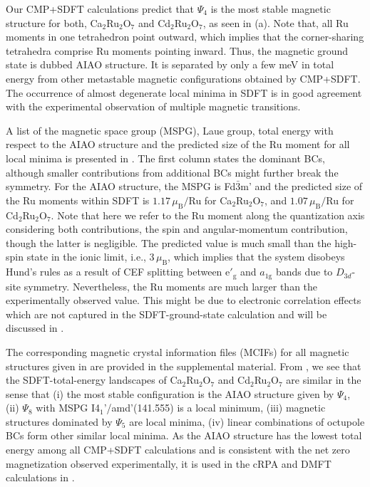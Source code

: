 \documentclass[10pt]{iopart}
\newcommand{\mub}{\,\mu_\text{B}}
\begin{document}
Our CMP+SDFT calculations predict that $\Psi_4$ is the most stable magnetic structure for both, Ca$_2$Ru$_2$O$_7$ and Cd$_2$Ru$_2$O$_7$, as seen in  (a). Note that, all Ru moments in one tetrahedron point outward, which implies that the corner-sharing tetrahedra comprise Ru moments pointing inward. Thus, the magnetic ground state is dubbed AIAO structure. It is separated by only a few meV in total energy from other metastable magnetic configurations obtained by CMP+SDFT. The occurrence of almost degenerate local minima in SDFT is in good agreement with the experimental observation of multiple magnetic transitions. 

A list of the magnetic space group (MSPG), Laue group, total energy with respect to the AIAO structure and the predicted size of the Ru moment for all local minima is presented in . The first column states the dominant BCs, although smaller contributions from additional BCs might further break the symmetry. For the AIAO structure, the MSPG is Fd$\bar{3}$m' and the predicted size of the Ru moments within SDFT is $1.17\mub/$Ru for Ca$_2$Ru$_2$O$_7$, and $1.07\mub/$Ru for Cd$_2$Ru$_2$O$_7$. Note that here we refer to the Ru moment along the quantization axis considering both contributions, the spin and angular-momentum contribution, though the latter is negligible.
The predicted value is much small than the high-spin state in the ionic limit, i.e., $3\mub$, which implies that the system disobeys Hund's rules as a result of CEF splitting between e$'_\mathrm{g}$ and $a_{1\mathrm{g}}$ bands due to $D_{3d}$-site symmetry. Nevertheless, the Ru moments are much larger than the experimentally observed value. This might be due to electronic correlation effects which are not captured in the SDFT-ground-state calculation and will be discussed in .

The corresponding magnetic crystal information files (MCIFs) for all magnetic structures given in  are provided in the supplemental material. From , we see that the SDFT-total-energy landscapes of Ca$_2$Ru$_2$O$_7$ and Cd$_2$Ru$_2$O$_7$ are similar in the sense that (i) the most stable configuration is the AIAO structure given by $\Psi_4$, (ii) $\Psi_8$ with MSPG I4$_1$'/amd'(141.555) is a local minimum, (iii) magnetic structures dominated by $\Psi_5$ are local minima, (iv) linear combinations of octupole BCs form other similar local minima. As the AIAO structure has the lowest total energy among all CMP+SDFT calculations and is consistent with the net zero magnetization observed experimentally, it is used in the cRPA and DMFT calculations in .
\end{document}
